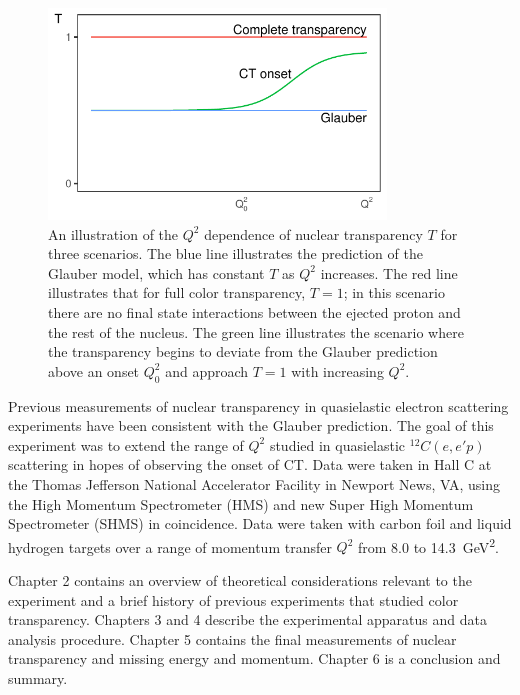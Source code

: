 \begin{figure}[!h]
    \centering
    \includegraphics[width=0.8\textwidth]{chap1/CT_toy_prediction.pdf}
    \caption{
            An illustration of the $Q^2$ dependence of nuclear transparency $T$
            for three scenarios.
            The blue line illustrates the prediction of the Glauber model,
            which has constant $T$ as $Q^2$ increases.
            The red line illustrates that for full color transparency, $T=1$;
            in this scenario there are no final state interactions between the
            ejected proton and the rest of the nucleus.
            The green line illustrates the scenario where the transparency
            begins to deviate from the Glauber prediction above an onset
            $Q_0^2$ and approach $T=1$ with increasing $Q^2$.
            }
    \label{fig:CT_toy_prediction}
\end{figure}

Previous measurements of nuclear transparency in quasielastic electron
scattering experiments have been consistent with the Glauber prediction.
The goal of this experiment was to extend the range of $Q^2$ studied
in quasielastic ${}^12C(e,e'p)$ scattering in hopes of observing the onset
of CT.
Data were taken in Hall C at the Thomas Jefferson National Accelerator Facility
in Newport News, VA, using the High Momentum Spectrometer (HMS) and new Super
High Momentum Spectrometer (SHMS) in coincidence.
Data were taken with carbon foil and liquid hydrogen targets over a range of
momentum transfer $Q^2$ from 8.0 to \SI{14.3}{\giga\electronvolt\squared}.


Chapter 2 contains an overview of theoretical considerations relevant to
the experiment and a brief history of previous experiments that studied color
transparency.
Chapters 3 and 4 describe the experimental apparatus and data analysis
procedure.
Chapter 5 contains the final measurements of nuclear transparency and missing
energy and momentum.
Chapter 6 is a conclusion and summary.
